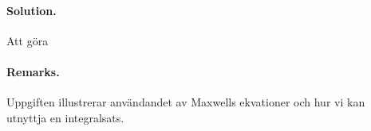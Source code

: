 \documentclass[%
oneside,                 %
final,                   %
10pt]{article}
\newenvironment{doconceexercise}{}{}
\begin{document}
\begin{doconceexercise}


\paragraph{Solution.}
Att göra



\paragraph{Remarks.}
Uppgiften illustrerar användandet av Maxwells ekvationer och hur vi kan utnyttja en integralsats.


\end{doconceexercise}



\end{document}
